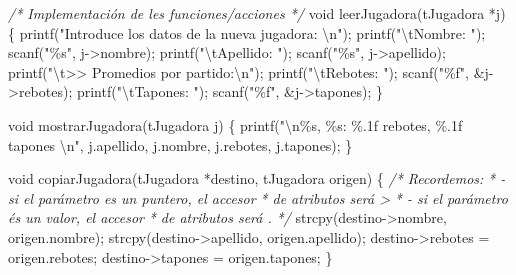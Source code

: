 \documentclass[
]{book}
\newenvironment{Shaded}{\begin{snugshade}}{\end{snugshade}}
\newcommand{\CommentTok}[1]{\textcolor[rgb]{0.56,0.35,0.01}{\textit{#1}}}
\newcommand{\DataTypeTok}[1]{\textcolor[rgb]{0.13,0.29,0.53}{#1}}
\newcommand{\NormalTok}[1]{#1}
\newcommand{\SpecialCharTok}[1]{\textcolor[rgb]{0.00,0.00,0.00}{#1}}
\newcommand{\StringTok}[1]{\textcolor[rgb]{0.31,0.60,0.02}{#1}}
\begin{document}
\begin{Shaded}
\begin{Highlighting}[]
\CommentTok{/* Implementación de les funciones/acciones */}
\DataTypeTok{void}\NormalTok{ leerJugadora(tJugadora *j) \{}
\NormalTok{    printf(}\StringTok{"Introduce los datos de la nueva jugadora: }\SpecialCharTok{\textbackslash{}n}\StringTok{"}\NormalTok{);}
\NormalTok{    printf(}\StringTok{"}\SpecialCharTok{\textbackslash{}t}\StringTok{Nombre: "}\NormalTok{);}
\NormalTok{    scanf(}\StringTok{"\%s"}\NormalTok{, j{-}\textgreater{}nombre);}
\NormalTok{    printf(}\StringTok{"}\SpecialCharTok{\textbackslash{}t}\StringTok{Apellido: "}\NormalTok{);}
\NormalTok{    scanf(}\StringTok{"\%s"}\NormalTok{, j{-}\textgreater{}apellido);}
\NormalTok{    printf(}\StringTok{"}\SpecialCharTok{\textbackslash{}t}\StringTok{\textgreater{}\textgreater{} Promedios por partido:}\SpecialCharTok{\textbackslash{}n}\StringTok{"}\NormalTok{);}
\NormalTok{    printf(}\StringTok{"}\SpecialCharTok{\textbackslash{}t}\StringTok{Rebotes: "}\NormalTok{);}
\NormalTok{    scanf(}\StringTok{"\%f"}\NormalTok{, \&j{-}\textgreater{}rebotes);}
\NormalTok{    printf(}\StringTok{"}\SpecialCharTok{\textbackslash{}t}\StringTok{Tapones: "}\NormalTok{);}
\NormalTok{    scanf(}\StringTok{"\%f"}\NormalTok{, \&j{-}\textgreater{}tapones);}
\NormalTok{\}}

\DataTypeTok{void}\NormalTok{ mostrarJugadora(tJugadora j) \{}
\NormalTok{    printf(}\StringTok{"}\SpecialCharTok{\textbackslash{}n}\StringTok{\%s, \%s: \%.1f rebotes, \%.1f tapones }\SpecialCharTok{\textbackslash{}n}\StringTok{"}\NormalTok{, j.apellido, j.nombre, j.rebotes, j.tapones);}
\NormalTok{\}}

\DataTypeTok{void}\NormalTok{ copiarJugadora(tJugadora *destino, tJugadora origen) \{}
    \CommentTok{/* Recordemos: }
\CommentTok{     * {-} si el parámetro es un puntero, el accesor}
\CommentTok{     *   de atributos será \textquotesingle{}{-}\textgreater{}\textquotesingle{}}
\CommentTok{     * {-} si el parámetro és un valor, el accesor}
\CommentTok{     *   de atributos será \textquotesingle{}.\textquotesingle{}}
\CommentTok{     */}
\NormalTok{    strcpy(destino{-}\textgreater{}nombre, origen.nombre);}
\NormalTok{    strcpy(destino{-}\textgreater{}apellido, origen.apellido);}
\NormalTok{    destino{-}\textgreater{}rebotes = origen.rebotes;}
\NormalTok{    destino{-}\textgreater{}tapones = origen.tapones;}
\NormalTok{\}}


\end{Highlighting}
\end{Shaded}
\end{document}
